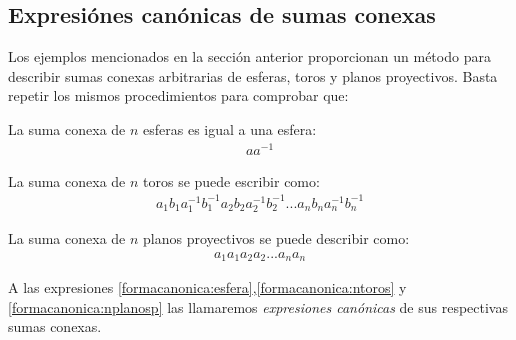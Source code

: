 \documentclass[a4paper,11pt,spanish, twoside, leqno]{tfg-uam}
\theoremstyle{definition}
\begin{document}
\subsection*{Expresiónes canónicas de sumas conexas}

Los ejemplos mencionados en la sección anterior proporcionan un método para describir sumas conexas arbitrarias de esferas, toros y planos proyectivos. Basta repetir los mismos procedimientos para comprobar que:

\begin{list}{-}{}
	\item La suma conexa de $ n $ esferas es igual a una esfera:
	\begin{align}\label{formacanonica:esfera}
		aa^{-1} 
	\end{align}
	\item La suma conexa de $ n $ toros se puede escribir como:
	\begin{align}\label{formacanonica:ntoros}
		a_1b_1a_1^{-1}b_1^{-1}a_2b_2a_2^{-1}b_2^{-1}...a_nb_na_n^{-1}b_n^{-1}
	\end{align}
	\item La suma conexa de $ n $ planos proyectivos se puede describir como: 
	\begin{align}\label{formacanonica:nplanosp}
	a_1a_1a_2a_2...a_na_n
	\end{align}
\end{list}
A las expresiones \ref{formacanonica:esfera},\ref{formacanonica:ntoros} y \ref{formacanonica:nplanosp} las llamaremos \textit{expresiones canónicas} de sus respectivas sumas conexas.
\end{document}
